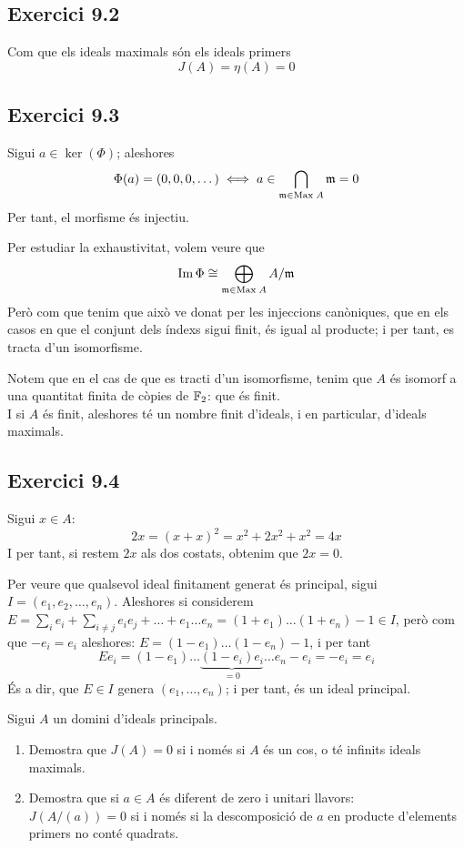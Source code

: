 \documentclass[11pt, a4paper]{article}
\begin{document}
\subsection{Exercici 9.2}
Com que els ideals maximals són els ideals primers
\[
    J(A)=\eta(A)=0
\]
\subsection{Exercici 9.3}
Sigui $a\in\ker(\Phi)$; aleshores
\[
    \Phi(a)=(0,0,0,\dots)\iff a\in\bigcap _{\mathfrak m\in\mathrm {Max}\;A}\mathfrak m=0
\]
Per tant, el morfisme és injectiu.\par
Per estudiar la exhaustivitat, volem veure que 
\[\operatorname{Im} \Phi\cong \bigoplus_{\mathfrak m\in\mathrm{Max}\; A}A/\mathfrak m\]
Però com que tenim que això ve donat per les injeccions canòniques, que en els casos en que el conjunt dels índexs sigui finit, és igual al producte; i per tant, es tracta d'un isomorfisme.\par
Notem que en el cas de que es tracti d'un isomorfisme, tenim que $A$ és isomorf a una quantitat finita de còpies de $\mathbb F_2$: que és finit.\\
I si $A$ és finit, aleshores té un nombre finit d'ideals, i en particular, d'ideals maximals.
\subsection{Exercici 9.4}
Sigui $x\in A$:
\[
    2x=(x+x)^2=x^2+2x^2+x^2=4x
\]
I per tant, si restem $2x$ als dos costats, obtenim que $2x=0$.\par
Per veure que qualsevol ideal finitament generat és principal, sigui $I=(e_1,e_2,\dots,e_n)$. Aleshores si considerem $E=\sum_{i} e_i+\sum_{i\neq j} e_ie_j+\dots+e_1\dots e_n=(1+e_1)\dots(1+e_n)-1\in I$, però com que $-e_i=e_i$ aleshores: $E=(1-e_1)\dots(1-e_n)-1$, i per tant
\[
    E e_i = (1-e_1)\dots \underbrace{(1-e_i)e_i}_{=0}\dots e_n-e_i=-e_i = e_i
\]
És a dir, que $E\in I$ genera $(e_1,\dots, e_n)$; i per tant, és un ideal principal.
\newpage
\begin{tcolorbox}[title=\section{Exercici 10}]
    Sigui $A$ un domini d'ideals principals.
    \begin{enumerate}
        \item Demostra que $J(A)=0$ si i només si $A$ és un cos, o té infinits ideals maximals.
        \item Demostra que si $a\in A$ és diferent de zero i unitari llavors:\\
        $J(A/(a))=0$ si i només si la descomposició de $a$ en producte d'elements primers no conté quadrats.
    \end{enumerate}
\end{tcolorbox}
\newpage
\end{document}
